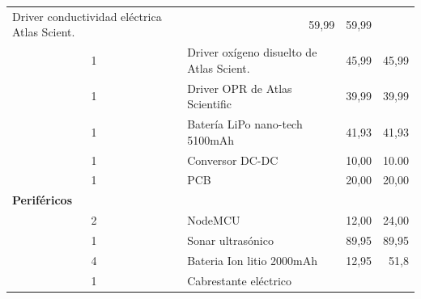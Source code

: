 \begin{table}[t]
\begin{tabular}{c l c c}
\multicolumn{1}{l}{Driver conductividad eléctrica Atlas Scient.} & 
\multicolumn{1}{r}{59,99}                          & 
\multicolumn{1}{r}{59,99}              \\ 
\multicolumn{1}{c}{1}                             & 
\multicolumn{1}{l}{Driver oxígeno disuelto de Atlas Scient.}        & 
\multicolumn{1}{r}{45,99}                          & 
\multicolumn{1}{r}{45,99}              \\ 
\multicolumn{1}{c}{1}                             & 
\multicolumn{1}{l}{Driver OPR de Atlas Scientific} & 
\multicolumn{1}{r}{39,99}                          & 
\multicolumn{1}{r}{39,99}              \\ 
\multicolumn{1}{c}{1}                             & 
\multicolumn{1}{l}{Batería LiPo nano-tech 5100mAh} & 
\multicolumn{1}{r}{41,93}                          & 
\multicolumn{1}{r}{41,93}              \\ 
\multicolumn{1}{c}{1}                             & 
\multicolumn{1}{l}{Conversor DC-DC}                & 
\multicolumn{1}{r}{10,00}                             & 
\multicolumn{1}{r}{10.00}                 \\ 
\multicolumn{1}{c}{1}                             & 
\multicolumn{1}{l}{PCB}                            & 
\multicolumn{1}{r}{20,00}                             &
\multicolumn{1}{r}{20,00}                 \\ 
\multicolumn{2}{l}{\textbf{Periféricos}}          &
\multicolumn{2}{l}{}                                                             \\ 
\hline
\multicolumn{1}{c}{2}                             & 
\multicolumn{1}{l}{NodeMCU}                        & 
\multicolumn{1}{r}{12,00}                             & 
\multicolumn{1}{r}{24,00}                 \\ 
\multicolumn{1}{c}{1}                             & 
\multicolumn{1}{l}{Sonar ultrasónico}              & 
\multicolumn{1}{r}{89,95}                          & 
\multicolumn{1}{r}{89,95}              \\ 
\multicolumn{1}{c}{4}                             & 
\multicolumn{1}{l}{Bateria Ion litio 2000mAh}      & 
\multicolumn{1}{r}{12,95}                          & 
\multicolumn{1}{r}{51,8}               \\ 
\multicolumn{1}{c}{1}                             & 
\multicolumn{1}{l}{Cabrestante eléctrico}          & 

\end{tabular}
\end{table}
